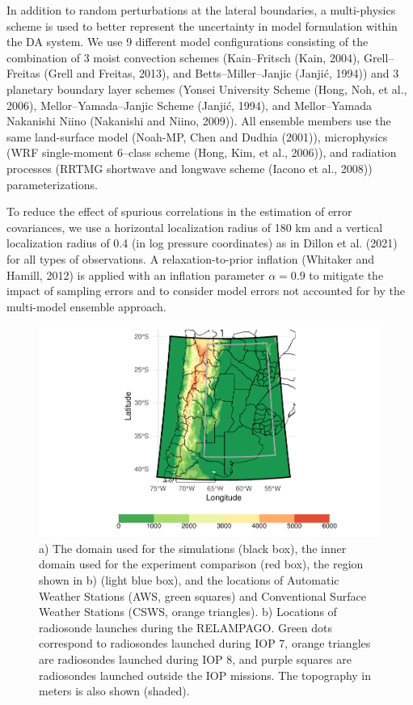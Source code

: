 \documentclass[authoryear,preprint,review,12pt]{elsarticle} %
\begin{document}
In addition to random perturbations at the lateral boundaries, a multi-physics scheme is used to better represent the uncertainty in model formulation within the DA system. We use 9 different model configurations consisting of the combination of 3 moist convection schemes (Kain--Fritsch (Kain, 2004), Grell--Freitas (Grell and Freitas, 2013), and Betts--Miller--Janjic (Janjić, 1994)) and 3 planetary boundary layer schemes (Yonsei University Scheme (Hong, Noh, et al., 2006), Mellor--Yamada--Janjic Scheme (Janjić, 1994), and Mellor--Yamada Nakanishi Niino (Nakanishi and Niino, 2009)). All ensemble members use the same land-surface model (Noah-MP, Chen and Dudhia (2001)), microphysics (WRF single-moment 6--class scheme (Hong, Kim, et al., 2006)), and radiation processes (RRTMG shortwave and longwave scheme (Iacono et al., 2008)) parameterizations.

To reduce the effect of spurious correlations in the estimation of error covariances, we use a horizontal localization radius of 180 km and a vertical localization radius of 0.4 (in log pressure coordinates) as in Dillon et al. (2021) for all types of observations.
A relaxation-to-prior inflation (Whitaker and Hamill, 2012) is applied with an inflation parameter \(\alpha=0.9\) to mitigate the impact of sampling errors and to consider model errors not accounted for by the multi-model ensemble approach.



\begin{figure}
\includegraphics[width=1\linewidth]{../figures/dominio-1} \caption{a) The domain used for the simulations (black box), the inner domain used for the experiment comparison (red box), the region shown in b) (light blue box), and the locations of Automatic Weather Stations (AWS, green squares) and Conventional Surface Weather Stations (CSWS, orange triangles). b) Locations of radiosonde launches during the RELAMPAGO. Green dots correspond to radiosondes launched during IOP 7, orange triangles are radiosondes launched during IOP 8, and purple squares are radiosondes launched outside the IOP missions. The topography in meters is also shown (shaded).}\label{fig:dominio}
\end{figure}
\end{document}
